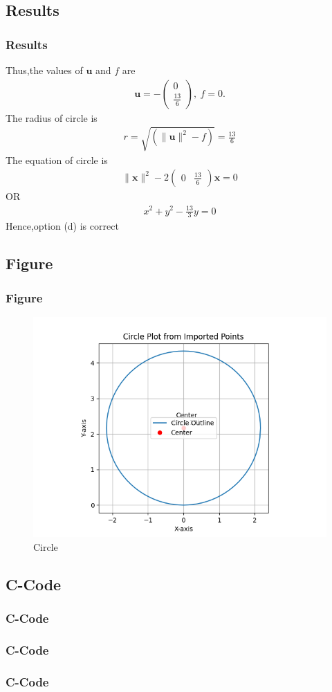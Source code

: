 \documentclass{beamer}
\theoremstyle{remark}
\providecommand{\norm}[1]{\lVert#1\rVert}
\newcommand{\myvec}[1]{\ensuremath{\begin{pmatrix}#1\end{pmatrix}}}
\let\vec\mathbf
\numberwithin{equation}{section}
\begin{document}
\subsection{Results}
\begin{frame}[fragile]
\frametitle{Results}

Thus,the values of $\vec{u}$ and $f$ are
\begin{align}
	\vec{u} = -\myvec{0\\\frac{13}{6}},\
	f = 0.
\end{align}
The radius of circle is
\begin{align}
	r=\sqrt{(\norm{\vec{u}}^2-f)}=\frac{13}{6}
\end{align}
The equation of circle is
\begin{align}
	\norm{\vec{x}}^2-2\myvec{0 & \frac{13}{6}}\vec{x}=0
\end{align}
OR
\begin{align}
x^2+y^2-\frac{13}{3}y=0
\end{align}
Hence,option (d) is correct

\end{frame}
%
\subsection{Figure}
\begin{frame}
\frametitle{Figure}
\begin{figure}
\centering
\includegraphics[width=0.6\columnwidth]{figs/Figure_1.png}
\caption{Circle}
\label{fig:circle_diameter}
\end{figure}
\end{frame}

\subsection{C-Code}
\begin{frame}
\frametitle{C-Code}


\end{frame}
\begin{frame}
\frametitle{C-Code}


\end{frame}
\begin{frame}
\frametitle{C-Code}


\end{frame}
\end{document}
